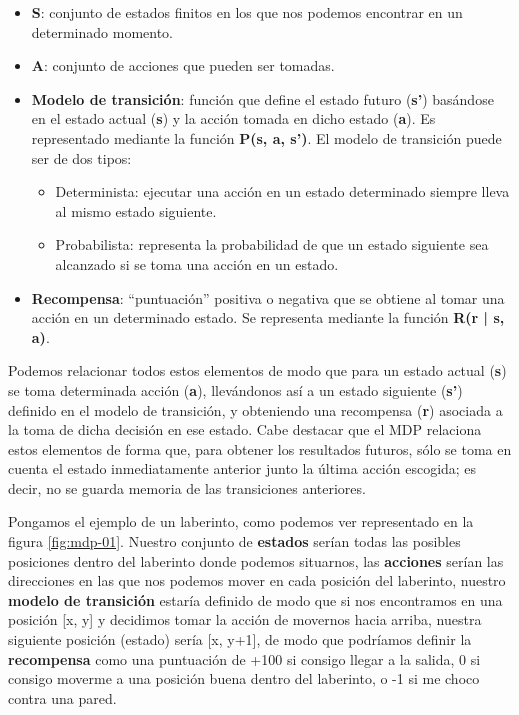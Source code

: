 \begin{itemize}
    \item \textbf{S}: conjunto de estados finitos en los que nos podemos encontrar en un determinado momento.
    \item \textbf{A}: conjunto de acciones que pueden ser tomadas.
    \item \textbf{Modelo de transición}: función que define el estado futuro (\textbf{s'}) basándose en el estado actual (\textbf{s}) y la acción tomada en dicho estado (\textbf{a}). Es representado mediante la función \textbf{P(s, a, s’)}. El modelo de transición puede ser de dos tipos:
    \begin{itemize}
        \item Determinista: ejecutar una acción en un estado determinado siempre lleva al mismo estado siguiente.
        \item Probabilista: representa la probabilidad de que un estado siguiente sea alcanzado si se toma una acción en un estado.
    \end{itemize}
    \item \textbf{Recompensa}: “puntuación” positiva o negativa que se obtiene al tomar una acción en un determinado estado. Se representa mediante la función \textbf{R(r | s, a)}.
\end{itemize}

Podemos relacionar todos estos elementos de modo que para un estado actual (\textbf{s}) se toma determinada acción (\textbf{a}), llevándonos así a un estado siguiente (\textbf{s'}) definido en el modelo de transición, y obteniendo una recompensa (\textbf{r}) asociada a la toma de dicha decisión en ese estado. Cabe destacar que el MDP relaciona estos elementos de forma que, para obtener los resultados futuros, sólo se toma en cuenta el estado inmediatamente anterior junto la última acción escogida; es decir, no se guarda memoria de las transiciones anteriores. 

Pongamos el ejemplo de un laberinto, como podemos ver representado en la figura \ref{fig:mdp-01}. Nuestro conjunto de \textbf{estados} serían todas las posibles posiciones dentro del laberinto donde podemos situarnos, las \textbf{acciones} serían las direcciones en las que nos podemos mover en cada posición del laberinto, nuestro \textbf{modelo de transición} estaría definido de modo que si nos encontramos en una posición [x, y] y decidimos tomar la acción de movernos hacia arriba, nuestra siguiente posición (estado) sería [x, y+1], de modo que podríamos definir la \textbf{recompensa} como una puntuación de +100 si consigo llegar a la salida, 0 si consigo moverme a una posición buena dentro del laberinto, o -1 si me choco contra una pared.

